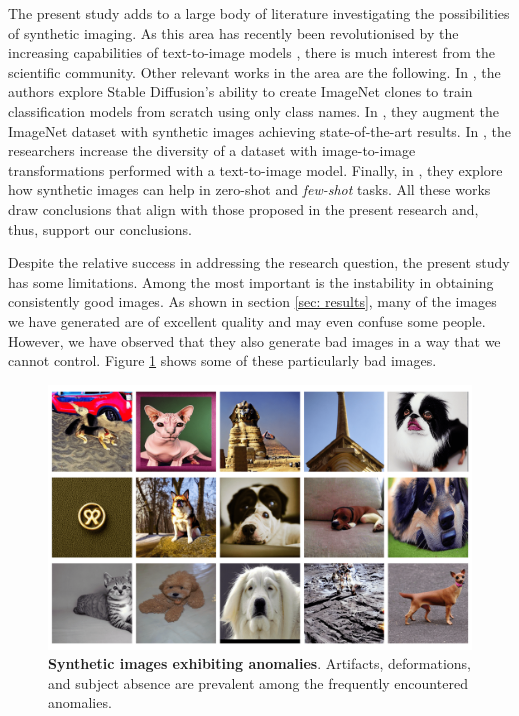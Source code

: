 The present study adds to a large body of literature investigating the possibilities of synthetic imaging. As this area has recently been revolutionised by the increasing capabilities of text-to-image models \cite{ho2020denoising, dhariwal2021diffusion}, there is much interest from the scientific community. Other relevant works in the area are the following. In \cite{sariyildiz2023fake}, the authors explore Stable Diffusion's ability to create ImageNet clones to train classification models from scratch using only class names. In \cite{azizi2023synthetic}, they augment the ImageNet dataset with synthetic images achieving state-of-the-art results. In \cite{trabucco2023effective}, the researchers increase the diversity of a dataset with image-to-image transformations performed with a text-to-image model. Finally, in \cite{he2022synthetic}, they explore how synthetic images can help in zero-shot and \textit{few-shot} tasks. All these works draw conclusions that align with those proposed in the present research and, thus, support our conclusions.

Despite the relative success in addressing the research question, the present study has some limitations. Among the most important is the instability in obtaining consistently good images. As shown in section \ref{sec: results}, many of the images we have generated are of excellent quality and may even confuse some people. However, we have observed that they also generate bad images in a way that we cannot control. Figure \ref{fig:low-quality} shows some of these particularly bad images. 

\begin{figure}
    \centering
    \includegraphics[width=1\textwidth]{Pictures/low-quality-img.png} 
    \caption{\textbf{Synthetic images exhibiting anomalies}. Artifacts, deformations, and subject absence are prevalent among the frequently encountered anomalies.}
    \label{fig:low-quality}
\end{figure}

